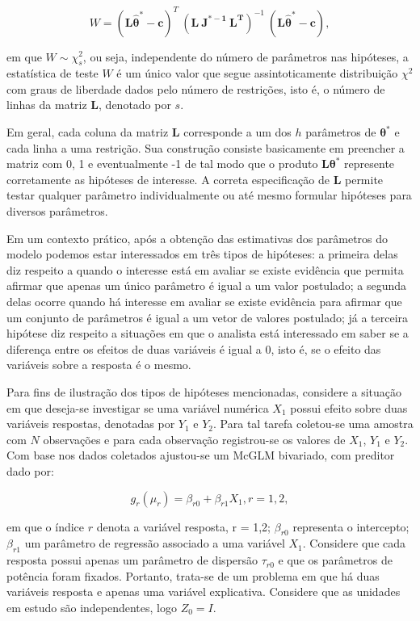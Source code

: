 \documentclass[AMA,STIX1COL]{WileyNJD-v2}
\begin{document}
$$
W = (\boldsymbol{L\hat\theta^{*}} - \boldsymbol{c})^T \ (\boldsymbol{L \ J^{\boldsymbol{*}-1} \ L^T})^{-1} \ (\boldsymbol{L\hat\theta^{*}} - \boldsymbol{c}),
$$

\noindent em que $W \sim \chi^2_s$, ou seja, independente do número de parâmetros nas hipóteses, a estatística de teste $W$ é um único valor que segue assintoticamente distribuição $\chi^2$ com graus de liberdade dados pelo número de restrições, isto é, o número de linhas da matriz $\boldsymbol{L}$, denotado por $s$.

Em geral, cada coluna da matriz $\boldsymbol{L}$ corresponde a um dos $h$ parâmetros de $\boldsymbol{\theta^{*}}$ e cada linha a uma restrição. Sua construção consiste basicamente em preencher a matriz com 0, 1 e eventualmente -1 de tal modo que o produto $\boldsymbol{L}\boldsymbol{\theta^{*}}$ represente corretamente as hipóteses de interesse. A correta especificação de $\boldsymbol{L}$ permite testar qualquer parâmetro individualmente ou até mesmo formular hipóteses para diversos parâmetros.

Em um contexto prático, após a obtenção das estimativas dos parâmetros do modelo podemos estar interessados em três tipos de hipóteses: a primeira delas diz respeito a quando o interesse está em avaliar se existe evidência que permita afirmar que apenas um único parâmetro é igual a um valor postulado; a segunda delas ocorre quando há interesse em avaliar se existe evidência para afirmar que um conjunto de parâmetros é igual a um vetor de valores postulado; já a terceira hipótese diz respeito a situações em que o analista está interessado em saber se a diferença entre os efeitos de duas variáveis é igual a 0, isto é, se o efeito das variáveis sobre a resposta é o mesmo.

Para fins de ilustração dos tipos de hipóteses mencionadas, considere a situação em que deseja-se investigar se uma variável numérica $X_1$ possui efeito sobre duas variáveis respostas, denotadas por $Y_1$ e $Y_2$. Para tal tarefa coletou-se uma amostra com $N$ observações e para cada observação registrou-se os valores de $X_1$, $Y_1$ e $Y_2$. Com base nos dados coletados ajustou-se um McGLM bivariado, com preditor dado por:

\begin{equation}
\label{eq:pred_ex}
g_r(\mu_r) = \beta_{r0} + \beta_{r1} X_1, r=1,2,
\end{equation}

\noindent em que o índice $r$ denota a variável resposta, r = 1,2; $\beta_{r0}$ representa o intercepto; $\beta_{r1}$ um parâmetro de regressão associado a uma variável $X_1$. Considere que cada resposta possui apenas um parâmetro de dispersão $\tau_{r0}$ e que os parâmetros de potência foram fixados. Portanto, trata-se de um problema em que há duas variáveis resposta e apenas uma variável explicativa. Considere que as unidades em estudo são independentes, logo $Z_0 = I$. 
\end{document}
